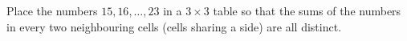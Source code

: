 Place the numbers $15,16,\dots,23$ in a $3\times3$ table so that the sums of the numbers in every two neighbouring cells (cells sharing a side) are all distinct.
